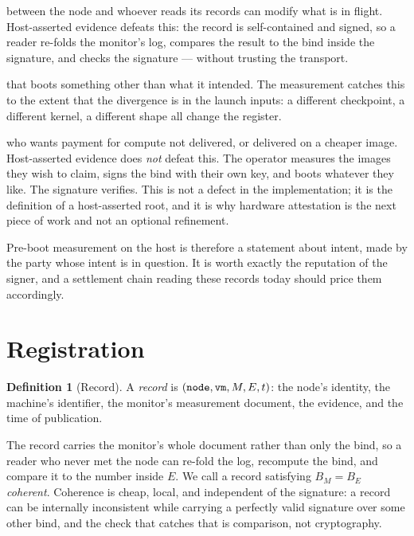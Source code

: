 \documentclass[11pt]{article}
\theoremstyle{definition}
\newtheorem{definition}{Definition}
\begin{document}
\begin{description}[leftmargin=1.4em]
  \item[A network adversary] between the node and whoever reads its records can
    modify what is in flight. Host-asserted evidence defeats this: the record is
    self-contained and signed, so a reader re-folds the monitor's log, compares
    the result to the bind inside the signature, and checks the signature ---
    without trusting the transport.
  \item[A confused or buggy node] that boots something other than what it
    intended. The measurement catches this to the extent that the divergence is
    in the launch inputs: a different checkpoint, a different kernel, a different
    shape all change the register.
  \item[A dishonest node operator] who wants payment for compute not delivered,
    or delivered on a cheaper image. Host-asserted evidence does \emph{not}
    defeat this. The operator measures the images they wish to claim, signs the
    bind with their own key, and boots whatever they like. The signature
    verifies. This is not a defect in the implementation; it is the definition of
    a host-asserted root, and it is why hardware attestation is the next piece of
    work and not an optional refinement.
\end{description}

Pre-boot measurement on the host is therefore a statement about intent, made by
the party whose intent is in question. It is worth exactly the reputation of the
signer, and a settlement chain reading these records today should price them
accordingly.

\section{Registration}

\begin{definition}[Record]
A \emph{record} is $(\texttt{node}, \texttt{vm}, M, E, t)$: the node's identity, the
machine's identifier, the monitor's measurement document, the evidence, and the
time of publication.
\end{definition}

The record carries the monitor's whole document rather than only the bind, so a
reader who never met the node can re-fold the log, recompute the bind, and
compare it to the number inside $E$. We call a record satisfying
$B_M = B_E$ \emph{coherent}. Coherence is cheap, local, and independent of the
signature: a record can be internally inconsistent while carrying a perfectly
valid signature over some other bind, and the check that catches that is
comparison, not cryptography.
\end{document}
